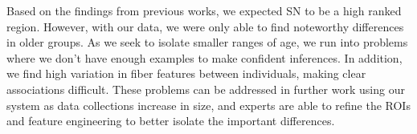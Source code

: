 




Based on the findings from previous works, we expected SN to be a high ranked region. However, with our data, we were only able to find noteworthy differences in older groups. As we seek to isolate smaller ranges of age, we run into problems where we don't have enough examples to make confident inferences. In addition, we find high variation in fiber features between individuals, making clear associations difficult. These problems can be addressed in further work using our system as data collections increase in size, and experts are able to refine the ROIs and feature engineering to better isolate the important differences.

